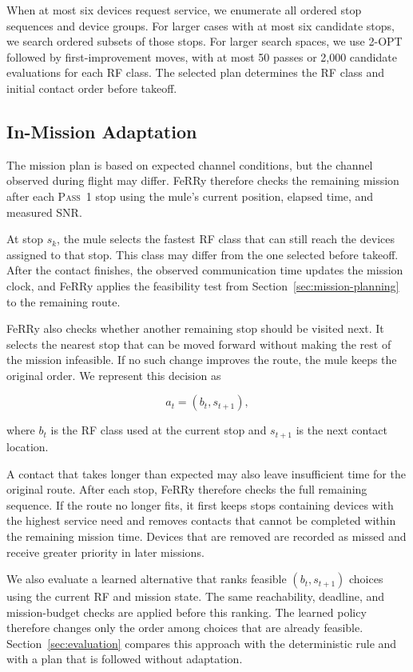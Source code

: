 \documentclass[conference]{IEEEtran}
\begin{document}
When at most six devices request service, we enumerate all ordered stop
sequences and device groups. For larger cases with at most six candidate stops,
we search ordered subsets of those stops. For larger search spaces, we use
2-OPT followed by first-improvement moves, with at most 50 passes or 2,000
candidate evaluations for each RF class. The selected plan determines the RF
class and initial contact order before takeoff.

\subsection{In-Mission Adaptation}
\label{sec:inmission}

The mission plan is based on expected channel conditions, but the channel
observed during flight may differ. FeRRy therefore checks the remaining mission
after each \textsc{Pass~1} stop using the mule's current position, elapsed time,
and measured SNR.

At stop $s_k$, the mule selects the fastest RF class that can still reach the
devices assigned to that stop. This class may differ from the one selected
before takeoff. After the contact finishes, the observed communication time
updates the mission clock, and FeRRy applies the feasibility test from
Section~\ref{sec:mission-planning} to the remaining route.

FeRRy also checks whether another remaining stop should be visited next. It
selects the nearest stop that can be moved forward without making the rest of
the mission infeasible. If no such change improves the route, the mule keeps the
original order. We represent this decision as

\begin{equation}
a_t=(b_t,s_{t+1}),
\end{equation}

where $b_t$ is the RF class used at the current stop and $s_{t+1}$ is the next
contact location.

A contact that takes longer than expected may also leave insufficient time for
the original route. After each stop, FeRRy therefore checks the full remaining
sequence. If the route no longer fits, it first keeps stops containing devices
with the highest service need and removes contacts that cannot be completed
within the remaining mission time. Devices that are removed are recorded as
missed and receive greater priority in later missions.

We also evaluate a learned alternative that ranks feasible
$(b_t,s_{t+1})$ choices using the current RF and mission state. The same
reachability, deadline, and mission-budget checks are applied before this
ranking. The learned policy therefore changes only the order among choices that
are already feasible. Section~\ref{sec:evaluation} compares this approach with
the deterministic rule and with a plan that is followed without adaptation.
\end{document}
